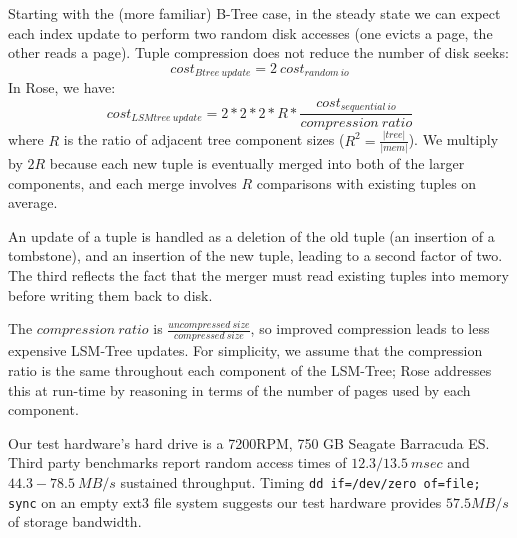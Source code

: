 \documentclass{vldb}
\newcommand{\rows}{Rose\xspace}
\begin{document}
Starting with the (more familiar) B-Tree case, in the steady state we
can expect each index update to perform two random disk accesses (one
evicts a page, the other reads a page).  Tuple compression does not
reduce the number of disk seeks:
\[
   cost_{Btree~update}=2~cost_{random~io}
\]
In \rows, we have:
\[
   cost_{LSMtree~update}=2*2*2*R*\frac{cost_{sequential~io}}{compression~ratio}  %
\]
where $R$ is the ratio of adjacent tree component sizes
($R^2=\frac{|tree|}{|mem|}$).  We multiply by $2R$ because each new
tuple is eventually merged into both of the larger components, and
each merge involves $R$ comparisons with existing tuples on average.

An update of a tuple is handled as a deletion of the old tuple (an
insertion of a tombstone), and an insertion of the new tuple, leading
to a second factor of two.  The third reflects the fact that the
merger must read existing tuples into memory before writing them back
to disk.

The $compression~ratio$ is
$\frac{uncompressed~size}{compressed~size}$, so improved compression
leads to less expensive LSM-Tree updates.  For simplicity, we assume
that the compression ratio is the same throughout each component of
the LSM-Tree; \rows addresses this at run-time by reasoning in terms
of the number of pages used by each component.

Our test hardware's hard drive is a 7200RPM, 750 GB Seagate Barracuda
ES.  
Third party
benchmarks\cite{hdBench} %
report random access times of $12.3/13.5~msec$ and $44.3-78.5~MB/s$
sustained throughput.  Timing {\tt dd if=/dev/zero of=file; sync} on an
empty ext3 file system suggests our test hardware provides $57.5MB/s$ of
storage bandwidth.

\end{document}
